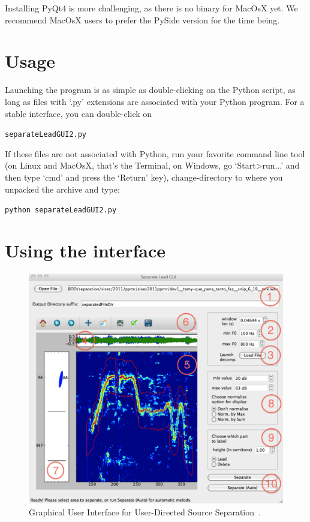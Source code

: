 \documentclass{article}
\begin{document}
Installing PyQt4 is more challenging, as there is no binary for MacOsX yet. We recommend MacOsX users to prefer the PySide version for the time being. 

\section{Usage}

Launching the program is as simple as double-clicking on the Python script, as long as files with `.py' extensions are associated with your Python program. For a stable interface, you can double-click on 

\begin{center}
\texttt{separateLeadGUI2.py}
\end{center}

If these files are not associated with Python, run your favorite command line tool (on Linux and MacOsX, that's the Terminal, on Windows, go `Start>run...' and then type `cmd' and press the `Return' key), change-directory to where you unpacked the archive and type:

\begin{center}
\texttt{python separateLeadGUI2.py}
\end{center}

\section{Using the interface}

\begin{figure}
\includegraphics[width=\textwidth]{gui2.pdf}
\caption{Graphical User Interface for User-Directed Source Separation~\cite{Durrieu2012}.}
\label{fig:interface}
\end{figure}
\end{document}

